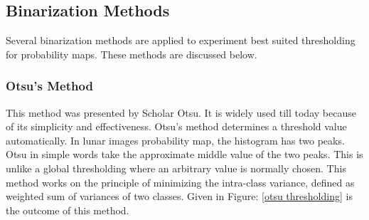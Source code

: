 \documentclass[11pt]{article}
\begin{document}

\subsection{Binarization Methods}
Several binarization methods are applied to experiment best suited thresholding for probability maps. These methods are discussed below.

\subsubsection{Otsu's Method}
This method was presented by Scholar Otsu. It is widely used till today because of its simplicity and effectiveness. Otsu's method determines a threshold value automatically. In lunar images probability map, the histogram has two peaks. Otsu in simple words take the approximate middle value of the two peaks. This is unlike a global thresholding where an arbitrary value is normally chosen. This method works on the principle of minimizing the intra-class variance, defined as weighted sum of variances of two classes. Given in Figure: \ref{otsu thresholding} is the outcome of this method.
\end{document}
